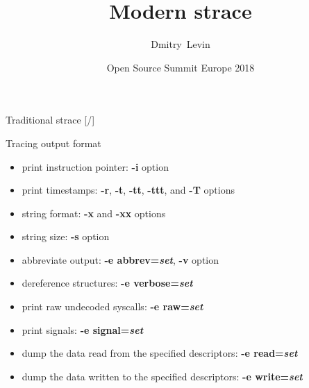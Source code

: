 \documentclass[unicode,aspectratio=169]{beamer}
\title{\Huge Modern strace}
\author{\Huge Dmitry~Levin}
\institute[BaseALT]{\Large BaseALT}
\date{Open Source Summit Europe 2018}
\begin{document}
\begin{frame}
\titlepage
\end{frame}

\begin{frame}{Traditional strace \hfill [\insertframenumber/\inserttotalframenumber]}
\begin{block}{\large Tracing output format}
\begin{itemize}
\item print instruction pointer: \textbf{-i} option
\item print timestamps: \textbf{-r}, \textbf{-t}, \textbf{-tt}, \textbf{-ttt}, and \textbf{-T} options
\item string format: \textbf{-x} and \textbf{-xx} options
\item string size: \textbf{-s} option
\item abbreviate output: \textbf{-e abbrev=\textit{set}}, \textbf{-v} option
\item dereference structures: \textbf{-e verbose=\textit{set}}
\item print raw undecoded syscalls: \textbf{-e raw=\textit{set}}
\item print signals: \textbf{-e signal=\textit{set}}
\item dump the data read from the specified descriptors: \textbf{-e read=\textit{set}}
\item dump the data written to the specified descriptors: \textbf{-e write=\textit{set}}
\end{itemize}
\end{block}
\end{frame}
\end{document}
